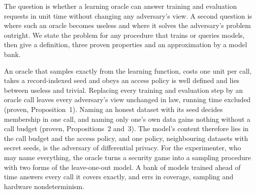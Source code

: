 \documentclass{labreport}
\begin{document}
\lrmaketitle

\lrscope
The question is whether a learning oracle can answer training and evaluation
requests in unit time without changing any adversary's view. A second question
is where such an oracle becomes useless and where it solves the adversary's
problem outright. We state the problem for any procedure that trains or queries
models, then give a definition, three proven properties and an approximation by
a model bank.

\lrresult
An oracle that samples exactly from the learning function, costs one unit per
call, takes a record-indexed seed and obeys an access policy is well defined and
lies between useless and trivial. Replacing every training and evaluation step
by an oracle call leaves every adversary's view unchanged in law, running time
excluded (proven, Proposition~1). Naming an honest dataset with its seed decides
membership in one call, and naming only one's own data gains nothing without a
call budget (proven, Propositions~2 and~3). The model's content therefore lies in
the call budget and the access policy, and one policy, neighbouring datasets
with secret seeds, is the adversary of differential privacy. For the
experimenter, who may name everything, the oracle turns a security game into a
sampling procedure with two forms of the leave-one-out model. A bank of models
trained ahead of time answers every call it covers exactly, and errs in
coverage, sampling and hardware nondeterminism.


\lrproduced
\begin{lrfacts}
\end{lrfacts}
\end{document}
